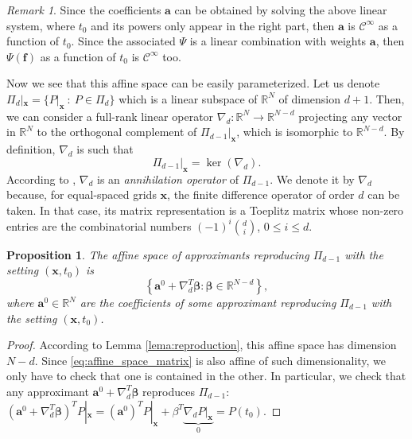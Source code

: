 \documentclass[preprint]{elsarticle}       %
\newcommand{\R}{\mathds{R}}
\newcommand{\lra}{\longrightarrow}
\newcommand{\cC}{\mathcal{C}}
\newcommand{\ba}{\bm{a}}
\newcommand{\bff}{\bm{f}}
\newcommand{\bx}{\bm{x}}
\newcommand{\bbeta}{\bm{\beta}}
\newcommand{\dif}{\nabla_d}
\theoremstyle{plain}
\newtheorem{prop}[thm]{Proposition}
\theoremstyle{remark}
\newtheorem{rmk}[thm]{Remark}
\begin{document}
\begin{rmk}
    Since the coefficients $\ba$ can be obtained by solving the above linear system, where $t_0$ and its powers only appear in the right part, then $\ba$ is $\cC^\infty$ as a function of $t_0$. Since the associated $\Psi$ is a linear combination with weights $\ba$, then $\Psi(\bff)$ as a function of \(t_0\) is $\cC^\infty$ too.
\end{rmk}

Now we see that this affine space can be easily parameterized. Let us denote $\Pi_d|_{\bx} = \{ P|_{\bx} \ : \ P\in\Pi_d\}$ which is a linear subspace of $\R^N$ of dimension $d+1$. Then, we can consider a full-rank linear operator $\nabla_d:\R^N \lra \R^{N-d}$ projecting any vector in $\R^N$ to the orthogonal complement of $\Pi_{d-1}|_{\bx}$, which is isomorphic to $\R^{N-d}$. By definition, $\nabla_d$ is such that
\begin{equation} \label{eq:annihilation}
	\Pi_{d-1}|_{\bx} = \ker(\dif).
\end{equation}
According to \cite{dynlevinluzzato,Lopez24}, $\nabla_d$ is an \emph{annihilation operator} of $\Pi_{d-1}$. We denote it by $\nabla_d$ because, for equal-spaced grids $\bx$, the finite difference operator of order $d$ can be taken. In that case, its matrix representation is a Toeplitz matrix whose non-zero entries are the combinatorial numbers $(-1)^i \binom{d}{i}$, $0\leq i \leq d$.

\begin{prop} \label{prop:affine_space} %
	The affine space of approximants reproducing $\Pi_{d-1}$ with the setting $(\bx, t_0)$ is
	\begin{equation} \label{eq:affine_space_matrix}
		\left \{ \ba^0 + \dif^T \bbeta : \bbeta\in\R^{N-d} \right \},
	\end{equation}
	where $\ba^0\in\R^N$ are the coefficients of some approximant reproducing $\Pi_{d-1}$ with the setting $(\bx, t_0)$.
\end{prop}
\begin{proof}
	According to Lemma \ref{lema:reproduction}, this affine space has dimension $N-d$. Since \eqref{eq:affine_space_matrix} is also affine of such dimensionality, we only have to check that one is contained in the other. In particular, we check that any approximant $\ba^0 + \dif^T \bbeta$ reproduces $\Pi_{d-1}$:
$
	\left ( \ba^0 + \dif^T \bbeta \right )^T P|_{\bx} =
	(\ba^0)^T P|_{\bx} + \beta^T  \underbrace{\dif P|_{\bx}}_{0} =
	P(t_0).
$
\end{proof}
\end{document}

